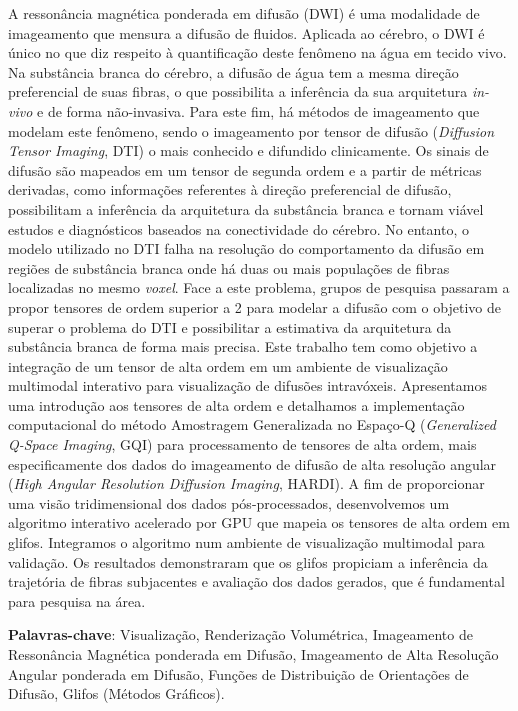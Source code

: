 \documentclass[
    12pt,                %
    oneside,            %
    a4paper,            %
    english,            %
    french,                %
    spanish,            %
    brazil                %
    ]{abntex2}
\begin{document}
\setlength{\absparsep}{18pt} %
\begin{resumo}

A ressonância magnética ponderada em difusão (DWI) é uma modalidade de imageamento que mensura a difusão de fluidos. Aplicada ao cérebro, o DWI é único no que diz respeito à quantificação deste fenômeno na água em tecido vivo. Na substância branca do cérebro, a difusão de água tem a mesma direção preferencial de suas fibras, o que possibilita a inferência da sua arquitetura \textit{in-vivo} e de forma não-invasiva. Para este fim, há métodos de imageamento que modelam este fenômeno, sendo o imageamento por tensor de difusão (\textit{Diffusion Tensor Imaging}, DTI) o mais conhecido e difundido clinicamente. Os sinais de difusão são mapeados em um tensor de segunda ordem e a partir de métricas derivadas, como informações referentes à direção preferencial de difusão, possibilitam a inferência da arquitetura da substância branca e tornam viável estudos e diagnósticos baseados na conectividade do cérebro. No entanto, o modelo utilizado no DTI falha na resolução do comportamento da difusão em regiões de substância branca onde há duas ou mais populações de fibras localizadas no mesmo \textit{voxel}. Face a este problema, grupos de pesquisa passaram a propor tensores de ordem superior a 2 para modelar a difusão com o objetivo de superar o problema do DTI e possibilitar a estimativa da arquitetura da substância branca de forma mais precisa. Este trabalho tem como objetivo a integração de um tensor de alta ordem em um ambiente de visualização multimodal interativo para visualização de difusões intravóxeis. Apresentamos uma introdução aos tensores de alta ordem  e detalhamos a implementação computacional do método Amostragem Generalizada no Espaço-Q (\textit{Generalized Q-Space Imaging}, GQI) para processamento de tensores de alta ordem, mais especificamente dos dados do imageamento de difusão de alta resolução angular (\textit{High Angular Resolution Diffusion Imaging}, HARDI). A fim de proporcionar uma visão tridimensional dos dados pós-processados, desenvolvemos um algoritmo interativo acelerado por GPU que mapeia os tensores de alta ordem em glifos. Integramos o algoritmo num ambiente de visualização multimodal para validação. Os resultados demonstraram que os glifos propiciam a inferência da trajetória de fibras subjacentes e avaliação dos dados gerados, que é fundamental para pesquisa na área.


\vspace{\onelineskip}
\noindent\textbf{Palavras-chave}: Visualização, Renderização Volumétrica, Imageamento de Ressonância Magnética ponderada em Difusão, Imageamento de Alta Resolução Angular ponderada em Difusão, Funções de Distribuição de Orientações de Difusão, Glifos (Métodos Gráficos).
\end{resumo}
\end{document}

